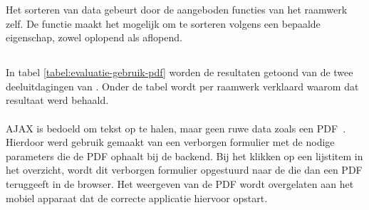 Het sorteren van data gebeurt door de aangeboden functies van het raamwerk zelf.
De functie  maakt het mogelijk om te sorteren volgens een bepaalde eigenschap, zowel oplopend als aflopend.



\subsection{}
\label{sec:evaluatie-gebruik-pdf}

In tabel \ref{tabel:evaluatie-gebruik-pdf} worden de resultaten getoond van de twee deeluitdagingen van .
Onder de tabel wordt per raamwerk verklaard waarom dat resultaat werd behaald.

\begin{table}[H]
\centering
{}
\caption{Gebruik van  voor \st{}~(\sta), \kendo{}~(\kendoa), \jqm{}~(\jqma) en \lungo{}~(\lungoa).}
\label{tabel:evaluatie-gebruik-pdf}
\end{table}

\paragraph{\jqm}
AJAX is bedoeld om tekst op te halen, maar geen ruwe data zoals een PDF~\cite{Scott2009}. 
Hierdoor werd gebruik gemaakt van een verborgen formulier met de nodige parameters die de PDF ophaalt bij de backend. 
Bij het klikken op een lijstitem in het overzicht, wordt dit verborgen formulier opgestuurd naar de  die dan een PDF teruggeeft in de browser. 
Het weergeven van de PDF wordt overgelaten aan het mobiel apparaat dat de correcte applicatie hiervoor opstart.

